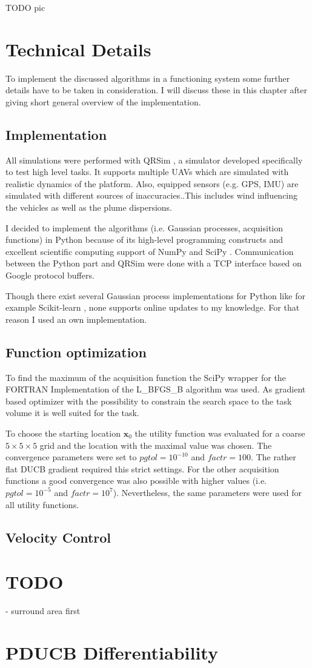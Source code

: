 \documentclass[11pt,a4paper]{scrreprt}
\newcommand{\vc}[1]{\bm{#1}}
\begin{document}
TODO pic

\chapter{Technical Details}
To implement the discussed algorithms in a functioning system some further 
details have to be taken in consideration. I will discuss these in this chapter 
after giving short general overview of the implementation.

\section{Implementation}
All simulations were performed with QRSim \parencite{denardi2013rn}, a simulator 
developed specifically to test high level tasks. It supports multiple UAVs which 
are simulated with realistic dynamics of the platform. Also, equipped sensors 
(e.g.  GPS, IMU) are simulated with different sources of inaccuracies..This 
includes wind influencing the vehicles as well as the plume dispersions.

I decided to implement the algorithms (i.e. Gaussian processes, acquisition 
functions) in Python because of its high-level programming constructs and 
excellent scientific computing support of NumPy and SciPy 
\parencite{Oliphant:2007dm}. Communication between the Python part and QRSim 
were done with a TCP interface based on Google protocol buffers.

Though there exist several Gaussian process implementations for Python like for 
example Scikit-learn \parencite[i.e.][]{scikit-learn}, none supports online 
updates to my knowledge.  For that reason I used an own implementation.

\section{Function optimization}
To find the maximum of the acquisition function the SciPy wrapper for the 
FORTRAN Implementation of the L\_BFGS\_B algorithm \parencite{Byrd:2006iv, 
    Zhu:1997br} was used. As gradient based optimizer with the possibility to 
constrain the search space to the task volume it is well suited for the task.

To choose the starting location $\vc x_0$ the utility function was evaluated for 
a coarse $5 \times 5 \times 5$ grid and the location with the maximal value was 
chosen. The convergence parameters were set to $\mathit{pgtol} = 10^{-10}$ and 
$\mathit{factr} = 100$. The rather flat DUCB gradient required this strict 
settings. For the other acquisition functions a good convergence was also 
possible with higher values (i.e.~$\mathit{pgtol} = 10^{-5}$ and $\mathit{factr} 
= 10^7$).  Nevertheless, the same parameters were used for all utility 
functions.

\section{Velocity Control}


\chapter{TODO}
- surround area first

\appendix
\chapter{PDUCB Differentiability}

\printbibliography
\end{document}
